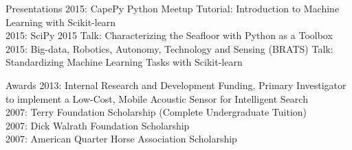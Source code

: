 \documentclass{resume} %
\begin{document}
\begin{rSection}{Presentations}
2015: CapePy Python Meetup Tutorial: Introduction to Machine Learning with Scikit-learn \smallskip \\
2015: SciPy 2015 Talk: Characterizing the Seafloor with Python as a Toolbox \smallskip \\
2015: Big-data, Robotics, Autonomy, Technology and Sensing (BRATS) Talk: Standardizing Machine Learning Tasks with Scikit-learn \\
\end{rSection}

\begin{rSection}{Awards}
{2013: Internal Research and Development Funding, Primary Investigator to implement a Low-Cost, Mobile Acoustic Sensor for Intelligent Search} \smallskip   \\
{2007: Terry Foundation Scholarship (Complete Undergraduate Tuition)}  \smallskip \\
{2007: Dick Walrath Foundation Scholarship} \smallskip \\
{2007: American Quarter Horse Association Scholarship} \smallskip \\
\end{rSection}
\end{document}
